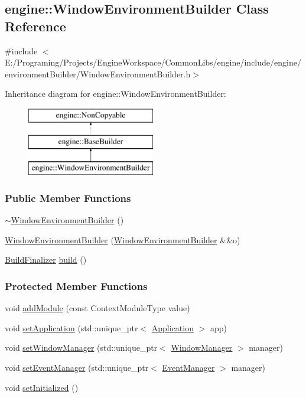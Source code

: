 \hypertarget{a00083}{}\subsection{engine\+:\+:Window\+Environment\+Builder Class Reference}
\label{a00083}


{\ttfamily \#include $<$E\+:/\+Programing/\+Projects/\+Engine\+Workspace/\+Common\+Libs/engine/include/engine/environment\+Builder/\+Window\+Environment\+Builder.\+h$>$}

Inheritance diagram for engine\+:\+:Window\+Environment\+Builder\+:\begin{figure}[H]
\begin{center}
\leavevmode
\includegraphics[height=3.000000cm]{a00083}
\end{center}
\end{figure}
\subsubsection*{Public Member Functions}
\begin{DoxyCompactItemize}
\item 
\hyperlink{a00083_a193f03159de54e2db47751504e523180}{$\sim$\+Window\+Environment\+Builder} ()
\item 
\hyperlink{a00083_a6a0e846406df6a3f23a8327d248a6534}{Window\+Environment\+Builder} (\hyperlink{a00083}{Window\+Environment\+Builder} \&\&o)
\item 
\hyperlink{a00011}{Build\+Finalizer} \hyperlink{a00083_adbe84bb40e32bc0d0b9a97dd63624610}{build} ()
\end{DoxyCompactItemize}
\subsubsection*{Protected Member Functions}
\begin{DoxyCompactItemize}
\item 
void \hyperlink{a00005_a52fb449fadc5d3a074e3fc7bfb56744b}{add\+Module} (const Context\+Module\+Type value)
\item 
void \hyperlink{a00005_a20c5dafa6892142bc352c13a5f3ac09a}{set\+Application} (std\+::unique\+\_\+ptr$<$ \hyperlink{a00002}{Application} $>$ app)
\item 
void \hyperlink{a00005_a641fb06484bdb07220f445f14db8c0e7}{set\+Window\+Manager} (std\+::unique\+\_\+ptr$<$ \hyperlink{a00087}{Window\+Manager} $>$ manager)
\item 
void \hyperlink{a00005_a52b490a3ef4d2a5b5b7e8e0f82d9a27c}{set\+Event\+Manager} (std\+::unique\+\_\+ptr$<$ \hyperlink{a00034}{Event\+Manager} $>$ manager)
\item 
void \hyperlink{a00005_af23e3bdfb30ca9f2076cacc9029d96c2}{set\+Initialized} ()
\end{DoxyCompactItemize}
